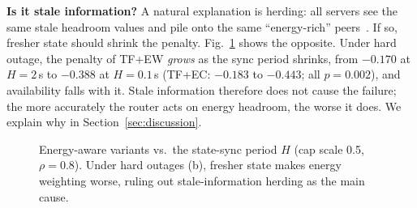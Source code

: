 \documentclass[journal]{IEEEtran}
\begin{document}
\begin{table}[t]
\centering
\caption{Energy ablation for TF+EW at cap scale 0.5, $\rho=0.8$ (10 seeds): energy weight $\beta$ and retention threshold $\theta$. $\beta=\theta=0$ is TF.}
\label{tab:ablation}
\end{table}

\textbf{Is it stale information?} A natural explanation is herding: all servers see the same stale headroom values and pile onto the same ``energy-rich'' peers~\cite{mitzenmacher2000old}. If so, fresher state should shrink the penalty. Fig.~\ref{fig:estale} shows the opposite. Under hard outage, the penalty of TF+EW \emph{grows} as the sync period shrinks, from $-0.170$ at $H=2$\,s to $-0.388$ at $H=0.1$\,s (TF+EC: $-0.183$ to $-0.443$; all $p=0.002$), and availability falls with it. Stale information therefore does not cause the failure; the more accurately the router acts on energy headroom, the worse it does. We explain why in Section~\ref{sec:discussion}.

\begin{figure}[t]
\centering
\resizebox{\columnwidth}{!}{%
}
\caption{Energy-aware variants vs.\ the state-sync period $H$ (cap scale 0.5, $\rho=0.8$). Under hard outages (b), fresher state makes energy weighting worse, ruling out stale-information herding as the main cause.}
\label{fig:estale}
\end{figure}
\end{document}
